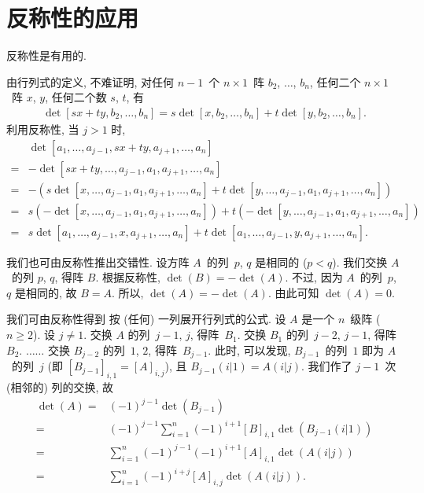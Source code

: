 \section{反称性的应用}

反称性是有用的.

由行列式的定义, 不难证明,
对任何 \(n-1\)~个 \(n \times 1\)~阵
\(b_2\), \(\dots\), \(b_n\),
任何二个 \(n \times 1\)~阵 \(x\), \(y\),
任何二个数 \(s\), \(t\),
有
\begin{align*}
    \det
    {[sx + ty, b_2, \dots, b_n]}
    = s
    \det {[x, b_2, \dots, b_n]}
    +
    t
    \det {[y, b_2, \dots, b_n]}.
\end{align*}
利用反称性, 当 \(j > 1\) 时,
\begin{align*}
         & \det
    {[a_1, \dots, a_{j-1}, sx + ty, a_{j+1}, \dots, a_n]}
    \\
    = {} & {-\det
            {[sx + ty, \dots, a_{j-1}, a_1, a_{j+1}, \dots, a_n]}}
    \\
    = {} & {-
            (s
            \det {[x, \dots, a_{j-1}, a_1, a_{j+1}, \dots, a_n]}
            +
            t
            \det {[y, \dots, a_{j-1}, a_1, a_{j+1}, \dots, a_n]}
            )
        }
    \\
    = {} &
    s(-\det {[x, \dots, a_{j-1}, a_1, a_{j+1}, \dots, a_n]})
    + t(-\det {[y, \dots, a_{j-1}, a_1, a_{j+1}, \dots, a_n]})
    \\
    = {} &
    s
    \det {[a_1, \dots, a_{j-1}, x, a_{j+1}, \dots, a_n]}
    +
    t
    \det {[a_1, \dots, a_{j-1}, y, a_{j+1}, \dots, a_n]}.
\end{align*}

我们也可由反称性推出交错性.
设方阵 \(A\)~的列~\(p\), \(q\) 是相同的 (\(p < q\)).
我们交换 \(A\)~的列 \(p\), \(q\), 得阵 \(B\).
根据反称性, \(\det {(B)} = -\det {(A)}\).
不过, 因为 \(A\)~的列~\(p\), \(q\) 是相同的,
故 \(B = A\).
所以, \(\det {(A)} = -\det {(A)}\).
由此可知 \(\det {(A)} = 0\).

我们可由反称性得到%
按 (任何) 一列展开行列式的公式.
设 \(A\) 是一个 \(n\)~级阵 (\(n \geq 2\)).
设 \(j \neq 1\).
交换 \(A\) 的列~\(j-1\), \(j\), 得阵~\(B_1\).
交换 \(B_1\) 的列~\(j-2\), \(j-1\), 得阵~\(B_2\).
\(\dots \dots\)
交换 \(B_{j-2}\) 的列~\(1\), \(2\), 得阵~\(B_{j-1}\).
此时, 可以发现,
\(B_{j-1}\)~的列~\(1\) 即为 \(A\)~的列~\(j\)
(即 \([B_{j-1}]_{i,1} = [A]_{i,j}\)),
且 \(B_{j-1}(i|1) = A(i|j)\).
我们作了 \(j-1\)~次 (相邻的) 列的交换,
故
\begin{align*}
    \det {(A)}
    = {} & (-1)^{j-1} \det {(B_{j-1})}
    \\
    = {} & (-1)^{j-1} \sum_{i = 1}^{n}
    {(-1)^{i+1} [B]_{i,1} \det {(B_{j-1}(i|1))}}
    \\
    = {} & \sum_{i = 1}^{n}
    {(-1)^{j-1} (-1)^{i+1} [A]_{i,1} \det {(A(i|j))}}
    \\
    = {} & \sum_{i = 1}^{n}
    {(-1)^{i+j} [A]_{i,j} \det {(A(i|j))}}.
\end{align*}

